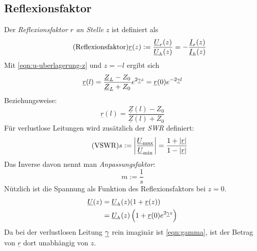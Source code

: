 \subsection{Reflexionsfaktor}
Der \emph{Reflexionsfaktor $r$ an Stelle $z$} ist definiert als
\begin{equation}
    \tag{Reflexionsfaktor}
    \underline{r}(z) := \frac{\underline{U}_r(z)}{\underline{U}_h(z)} = - \frac{\underline{I}_r(z)}{\underline{I}_h(z)}
\end{equation}
Mit \eqref{eqn:u-uberlagerung-z} und $z=-l$ ergibt sich
\begin{equation}
    \underline{r}(l) = \frac{\underline{Z}_L-Z_0}{\underline{Z}_L+Z_0} e^{2\underline{\gamma} z} = \underline{r}(0) e^{-2\underline{\gamma} l}
\end{equation}
Beziehungsweise:
\begin{equation}
   \underline{r}(l) = \frac{\underline{Z}(l)-Z_0}{\underline{Z}(l)+Z_0} 
\end{equation}
\noindent
Für verlustlose Leitungen wird zusätzlich der \emph{SWR} definiert:
\begin{equation}
    \tag{VSWR}
    s := \left| \frac{\underline{U}_\text{max}}{\underline{U}_\text{min}} \right| = \frac{1+|\underline{r}|}{1-|\underline{r}|}
\end{equation}
Das Inverse davon nennt man \emph{Anpassungsfaktor}:
\begin{equation}
    \tag{Anpassungsfaktor}
    m := \frac{1}{s}
\end{equation}
Nützlich ist die Spannung als Funktion des Reflexionsfaktors bei $z=0$.
\begin{equation}
    \begin{aligned}
        \underline{U}(z) &= \underline{U}_h(z)(1+\underline{r}(z))\\
                         &= \underline{U}_h(z)\left(1+\underline{r}(0) e^{2\underline{\gamma} z}\right)
    \end{aligned}
    \label{eqn:u-r}
\end{equation}
Da bei der verlustlosen Leitung $\underline{\gamma}$ rein imaginär ist \eqref{eqn:gamma}, ist der Betrag von $\underline{r}$ dort unabhängig von $z$.

